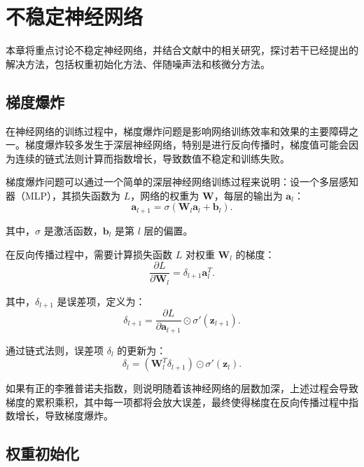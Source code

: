 
\chapter{不稳定神经网络}

本章将重点讨论不稳定神经网络，并结合文献中的相关研究，探讨若干已经提出的解决方法，包括权重初始化方法、伴随噪声法和核微分方法。

\section{梯度爆炸}

在神经网络的训练过程中，梯度爆炸问题是影响网络训练效率和效果的主要障碍之一。梯度爆炸较多发生于深层神经网络，特别是进行反向传播时，梯度值可能会因为连续的链式法则计算而指数增长，导致数值不稳定和训练失败。

梯度爆炸问题可以通过一个简单的深层神经网络训练过程来说明：设一个多层感知器（MLP），其损失函数为 \( L \)，网络的权重为 \(\mathbf{W}\)，每层的输出为 \(\mathbf{a}_l\)：
\begin{equation}
  \mathbf{a}_{l+1} = \sigma(\mathbf{W}_l \mathbf{a}_l + \mathbf{b}_l).
\end{equation}

其中，\(\sigma\) 是激活函数，\(\mathbf{b}_l\) 是第 \(l\) 层的偏置。

在反向传播过程中，需要计算损失函数 \(L\) 对权重 \(\mathbf{W}_l\) 的梯度：
\begin{equation}
  \frac{\partial L}{\partial \mathbf{W}_l} = \delta_{l+1} \mathbf{a}_l^T.
 \end{equation}

其中，\(\delta_{l+1}\) 是误差项，定义为：
\begin{equation}
  \delta_{l+1} = \frac{\partial L}{\partial \mathbf{a}_{l+1}} \odot \sigma'(\mathbf{z}_{l+1}).
 \end{equation}

通过链式法则，误差项 \(\delta_l\) 的更新为：
\begin{equation}
  \delta_l = (\mathbf{W}_l^T \delta_{l+1}) \odot \sigma'(\mathbf{z}_l).
\end{equation}

如果有正的李雅普诺夫指数，则说明随着该神经网络的层数加深，上述过程会导致梯度的累积乘积，其中每一项都将会放大误差，最终使得梯度在反向传播过程中指数增长，导致梯度爆炸。

\section{权重初始化}

